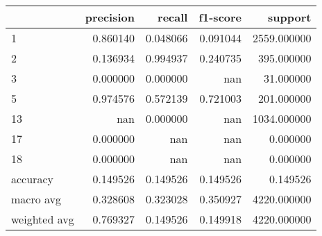 \begin{tabular}{lrrrr}
\toprule
 & precision & recall & f1-score & support \\
\midrule
1 & 0.860140 & 0.048066 & 0.091044 & 2559.000000 \\
2 & 0.136934 & 0.994937 & 0.240735 & 395.000000 \\
3 & 0.000000 & 0.000000 & nan & 31.000000 \\
5 & 0.974576 & 0.572139 & 0.721003 & 201.000000 \\
13 & nan & 0.000000 & nan & 1034.000000 \\
17 & 0.000000 & nan & nan & 0.000000 \\
18 & 0.000000 & nan & nan & 0.000000 \\
accuracy & 0.149526 & 0.149526 & 0.149526 & 0.149526 \\
macro avg & 0.328608 & 0.323028 & 0.350927 & 4220.000000 \\
weighted avg & 0.769327 & 0.149526 & 0.149918 & 4220.000000 \\
\bottomrule
\end{tabular}
